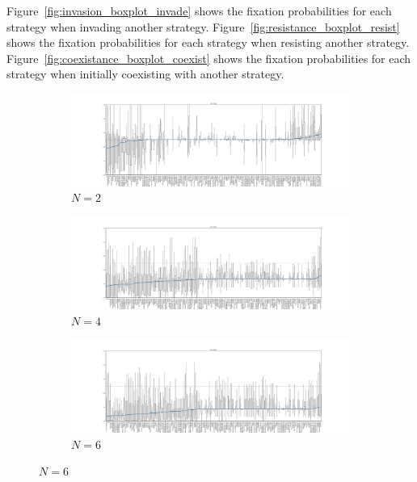 \documentclass{article}
\begin{document}
Figure~\ref{fig:invasion_boxplot_invade} shows the fixation probabilities for each
strategy when invading another strategy.
Figure~\ref{fig:resistance_boxplot_resist} shows the fixation probabilities for
each strategy when resisting another strategy.
Figure~\ref{fig:coexistance_boxplot_coexist} shows the fixation probabilities for
each strategy when initially coexisting with another strategy.

\begin{figure}[!hbtp]
    \centering
    \begin{subfigure}[t]{\textwidth}
        \centering
        \includegraphics[width=\textwidth]{../img/boxplot_2_invade.pdf}
        \caption{\(N=2\)}
    \end{subfigure}%

    \begin{subfigure}[t]{\textwidth}
        \centering
        \includegraphics[width=\textwidth]{../img/boxplot_4_invade.pdf}
        \caption{\(N=4\)}
    \end{subfigure}%

    \begin{subfigure}[t]{\textwidth}
        \centering
        \includegraphics[width=\textwidth]{../img/boxplot_6_invade.pdf}
        \caption{\(N=6\)}
    \end{subfigure}%


\end{figure}
\end{document}
